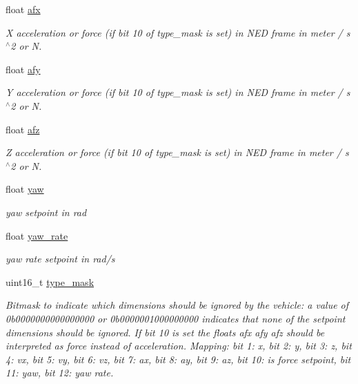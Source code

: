 \begin{DoxyCompactItemize}
float \hyperlink{struct____mavlink__position__target__local__ned__t_a254274f9dda96c07e4c5a237f0f67609}{afx}
\begin{DoxyCompactList}\small\item\em X acceleration or force (if bit 10 of type\+\_\+mask is set) in N\+E\+D frame in meter / s$^\wedge$2 or N. \end{DoxyCompactList}\item 
float \hyperlink{struct____mavlink__position__target__local__ned__t_a371a31bdc0b84e00766b108abd53f09f}{afy}
\begin{DoxyCompactList}\small\item\em Y acceleration or force (if bit 10 of type\+\_\+mask is set) in N\+E\+D frame in meter / s$^\wedge$2 or N. \end{DoxyCompactList}\item 
float \hyperlink{struct____mavlink__position__target__local__ned__t_a1aa7e3282c618f07e12efcae4f4071c3}{afz}
\begin{DoxyCompactList}\small\item\em Z acceleration or force (if bit 10 of type\+\_\+mask is set) in N\+E\+D frame in meter / s$^\wedge$2 or N. \end{DoxyCompactList}\item 
float \hyperlink{struct____mavlink__position__target__local__ned__t_adbb9606b0d2acbc414ac9f5b887ef2aa}{yaw}
\begin{DoxyCompactList}\small\item\em yaw setpoint in rad \end{DoxyCompactList}\item 
float \hyperlink{struct____mavlink__position__target__local__ned__t_aac456c006e0ab4bba92d09b76fbd0cf1}{yaw\+\_\+rate}
\begin{DoxyCompactList}\small\item\em yaw rate setpoint in rad/s \end{DoxyCompactList}\item 
uint16\+\_\+t \hyperlink{struct____mavlink__position__target__local__ned__t_a4210ddad325334f8c92e2c8a09415467}{type\+\_\+mask}
\begin{DoxyCompactList}\small\item\em Bitmask to indicate which dimensions should be ignored by the vehicle\+: a value of 0b0000000000000000 or 0b0000001000000000 indicates that none of the setpoint dimensions should be ignored. If bit 10 is set the floats afx afy afz should be interpreted as force instead of acceleration. Mapping\+: bit 1\+: x, bit 2\+: y, bit 3\+: z, bit 4\+: vx, bit 5\+: vy, bit 6\+: vz, bit 7\+: ax, bit 8\+: ay, bit 9\+: az, bit 10\+: is force setpoint, bit 11\+: yaw, bit 12\+: yaw rate. \end{DoxyCompactList}\item 

\end{DoxyCompactItemize}
